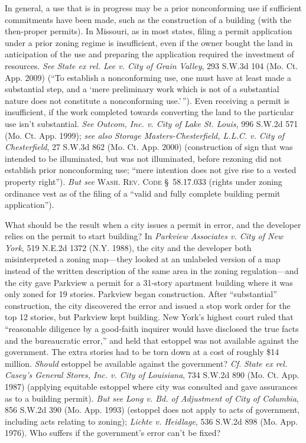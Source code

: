 In general, a use that is in progress may be a prior nonconforming use if
sufficient commitments have been made, such as the construction of a building
(with the then-proper permits). In Missouri, as in most states, filing a permit
application under a prior zoning regime is insufficient, even if the owner
bought the land in anticipation of the use and preparing the application
required the investment of resources. \textit{See} \emph{State ex rel. Lee v.
City of Grain Valley}, 293 S.W.3d 104 (Mo. Ct. App. 2009) (``To establish a
nonconforming use, one must have at least made a substantial step, and a `mere
preliminary work which is not of a substantial nature does not constitute a
nonconforming use.'\,''). Even receiving a permit is insufficient, if the work
completed towards converting the land to the particular use isn't substantial.
\textit{See} \emph{Outcom, Inc. v. City of Lake St. Louis}, 996 S.W.2d 571 (Mo.
Ct. App. 1999); \textit{see also} \emph{Storage Masters-Chesterfield, L.L.C. v.
City of Chesterfield}, 27 S.W.3d 862 (Mo. Ct. App. 2000) (construction of sign
that was intended to be illuminated, but was not illuminated, before rezoning
did not establish prior nonconforming use; ``mere intention does not give rise
to a vested property right''). \textit{But see} \textsc{Wash. Rev. Code}
\S~58.17.033 (rights under zoning ordinance vest as of the filing of a ``valid
and fully complete building permit application'').

What should be the result when a city issues a permit in error, and the
developer relies on the permit to start building? In \textit{Parkview Associates
v. City of New York}, 519 N.E.2d 1372 (N.Y. 1988), the city and the developer
both misinterpreted a zoning map---they looked at an unlabeled version of a map
instead of the written description of the same area in the zoning
regulation---and the city gave Parkview a permit for a 31-story apartment
building where it was only zoned for 19 stories. Parkview began construction.
After ``substantial'' construction, the city discovered the error and issued a
stop work order for the top 12 stories, but Parkview kept building. New York's
highest court ruled that ``reasonable diligence by a good-faith inquirer would
have disclosed the true facts and the bureaucratic error,'' and held that
estoppel was not available against the government. The extra stories had to be
torn down at a cost of roughly \$14 million. \textit{Should} estoppel be
available against the government? \textit{Cf.} \emph{State ex rel. Casey's
General Stores, Inc. v. City of Louisiana}, 734 S.W.2d 890 (Mo. Ct. App. 1987)
(applying equitable estoppel where city was consulted and gave assurances as to
a building permit). \textit{But see} \emph{Long v. Bd. of Adjustment of City of
Columbia}, 856 S.W.2d 390 (Mo. App. 1993) (estoppel does not apply to acts of
government, including acts relating to zoning); \emph{Lichte v. Heidlage}, 536
S.W.2d 898 (Mo. App. 1976). Who suffers if the government's error can't be
fixed?

